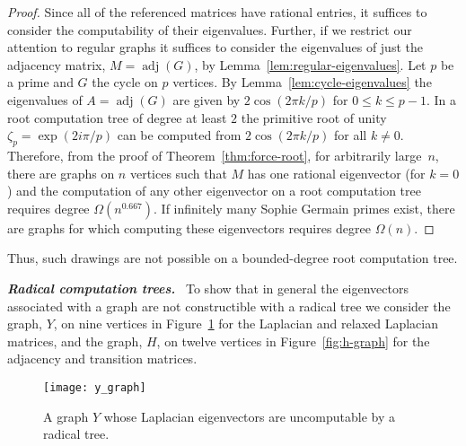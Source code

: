 \documentclass[oribibl,10pt]{llncs}
\newcommand{\Emph}[1]{\smallskip\textbf{\textit{#1}}~}
\DeclareMathOperator{\adjacency}{adj}
\begin{document}
\begin{proof}
Since all of the referenced matrices have rational entries, it suffices to consider the computability of their eigenvalues. 
Further, if we restrict our attention to regular graphs it suffices to consider the eigenvalues of just the adjacency matrix, 
$M = \adjacency(G)$, by Lemma~\ref{lem:regular-eigenvalues}. Let $p$ be a prime and $G$ the cycle on $p$ vertices. By Lemma~\ref{lem:cycle-eigenvalues} the eigenvalues of $A = \adjacency(G)$ are given by $2\cos(2\pi k/p)$ for $0 \leq k \leq p-1$.
In a root computation tree of degree at least $2$ the primitive root of unity $\zeta_p = \exp(2i\pi/p)$ can be computed from $2\cos(2\pi k/p)$ for all $k \neq 0$. 
Therefore, from the proof of Theorem~\ref{thm:force-root},
for arbitrarily large~$n$, 
there are graphs on $n$ vertices such that $M$ has one rational eigenvector (for $k=0$) and 
the computation of any other eigenvector on a root computation tree requires degree $\Omega(n^{0.667})$.
If infinitely many Sophie Germain primes exist, there are graphs for which computing these eigenvectors requires degree $\Omega(n)$.
\end{proof}

Thus, such drawings are not possible on a bounded-degree root computation tree.

\Emph{Radical computation trees.} To show that in general the eigenvectors associated with a graph are not constructible with a radical tree we consider the graph, $Y$, on nine vertices in Figure~\ref{fig:y-graph} for the Laplacian and relaxed Laplacian matrices, and the graph, $H$, on twelve vertices in Figure~\ref{fig:h-graph} for the adjacency and transition matrices.

\begin{figure}[htb]
\vspace*{-12pt}
\centering
\texttt{[image: y\_graph]}
\caption{A graph $Y$ whose Laplacian eigenvectors are uncomputable by a radical tree.}
\label{fig:y-graph}
\end{figure}
\end{document}
